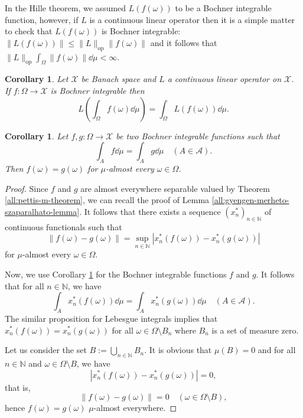 \documentclass[a4paper, 12pt]{article}
\newtheorem{corollary}[lem]{Corollary}
\begin{document}
In the Hille theorem, we assumed $L(f(\omega))$ to be a Bochner integrable function, however, if $L$ is a continuous linear operator then it is a simple matter to check that $L(f(\omega))$ is Bochner integrable: $\|L(f(\omega))\| \leqslant \| L \|_{\mathrm{op}} \| f(\omega) \|$ and it follows that $\|L \|_{\mathrm{op}} \int_{\Omega} \| f(\omega) \| \dd{\mu} < \infty$.
\begin{corollary}\label{all:hille-for-continuos-lin-functionals}
Let $\mathcal{X}$ be Banach space and $L$ a continuous linear operator on $\mathcal{X}$. If $f \colon \Omega \rightarrow \mathcal{X}$ is Bochner integrable then
$$L\left( \int_{\Omega} f(\omega) \dd{\mu} \right) = \int_{\Omega} L(f(\omega)) \dd{\mu}.$$
\end{corollary}
\begin{corollary}\label{all:bochner-int-imply-almost-everywhere-eq} Let $f,g\colon \Omega \to \mathcal{X}$ be two Bochner integrable functions such that
$$\int_{A} f \dd{\mu} = \int_{A} g \dd{\mu} \quad (A \in \mathcal{A}).$$
Then $f(\omega) = g(\omega)$ for $\mu$-almost every $\omega \in \Omega$.
\end{corollary}
\begin{proof}
Since $f$ and $g$ are almost everywhere separable valued by Theorem \ref{all:pettis-m-theorem}, we can recall the proof of Lemma \ref{all:gyengen-merheto-szaparalhato-lemma}. It follows that there exists a sequence $(x^{*}_n)_{n \in \mathbb{N}}$ of continuous functionals such that
$$\|f(\omega) - g(\omega)\| = \sup\limits_{n \in \mathbb{N}} |x^{*}_n(f(\omega)) - x^{*}_n(g(\omega))|$$
for $\mu$-almost every $\omega \in \Omega$.

Now, we use Corollary \ref{all:hille-for-continuos-lin-functionals} for the Bochner integrable functions $f$ and $g$. It follows that for all $n \in \mathbb{N}$, we have
$$\int_{A} x^*_n(f(\omega)) \dd{\mu} = \int_{A} x^*_n(g(\omega)) \dd{\mu} \quad (A \in \mathcal{A}).$$
The similar proposition for Lebesgue integrals implies that $x_n^*(f(\omega))= x_n^*(g(\omega))$ for all $\omega \in \Omega \setminus B_n$ where $B_n$ is a set of measure zero. 

Let us consider the set $B:= \bigcup_{n \in \mathbb{N}} B_n$. It is obvious that $\mu(B)= 0$ and for all $n \in \mathbb{N}$ and $\omega \in \Omega \setminus B$, we have
$$|x^{*}_n(f(\omega)) - x^{*}_n(g(\omega))| = 0,$$
that is,
$$\|f(\omega) - g(\omega)\| = 0 \quad (\omega \in \Omega \setminus B),$$
hence $f(\omega)=g(\omega)$ $\mu$-almost everywhere.
\end{proof}
\end{document}
